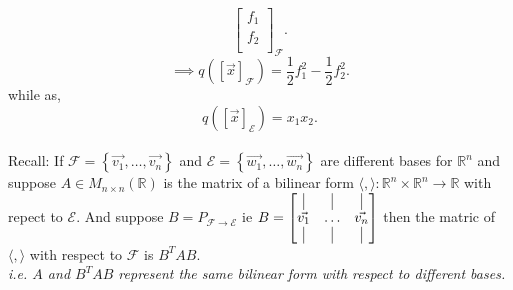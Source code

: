 \documentclass{report}
\begin{document}
{\[\begin{bmatrix}
           f_1\\
           f_2\\
           \end{bmatrix}
           _{ \mathcal{F}}
          .\] 
          \[
           \implies q \left(  \left[ \vec{ x}  \right] _{ \mathcal{F}} \right) = \frac{1}{2} f_1 ^2 - \frac{1}{2} f_2 ^2 
          .\] 
          while as,
          \[
           q \left( \left[ \vec{ x}  \right] _{ \mathcal{E}}\right) = x_1 x_2 
          .\] 
          \\
          Recall: If $ \mathcal{F} = \left\{  \vec{ v_1} , \ldots , \vec{ v_n}  \right\}$ and $  \mathcal{E} = \left\{  \vec{ w_1} , \ldots , \vec{ w_n} \right\} $ are different bases for $ \mathbb{R} ^{n}$ and suppose $ A \in M _{ n \times n}\left( \mathbb{R} \right) $  is the matrix of a bilinear form $ \langle ,  \rangle : \mathbb{R} ^{n} \times \mathbb{R} ^{n} \to \mathbb{R} $ with repect to $ \mathcal{E}$. And suppose $ B = P _{ \mathcal{F}\to \mathcal{E} }$ ie $ B = \begin{bmatrix}
          \vline & \vline & \vline\\
          \vec{ v_1}  & \ldots & \vec{ v_n} \\
          \vline & \vline & \vline\\
          \end{bmatrix}$
          then the matric of $ \langle ,  \rangle $ with respect to $ \mathcal{F}$ is $ B ^{T}A B $.\\
          \textit{ i.e. $ A$ and $ B^{T}A B$ represent the same bilinear form with respect to different bases.}\\
 }             
\end{document}

